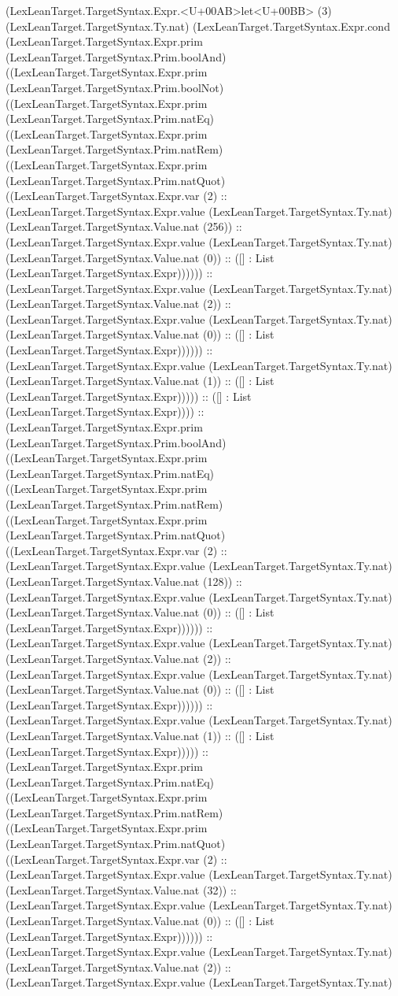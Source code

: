 \documentclass[11pt]{article}
\begin{document}
(LexLeanTarget.TargetSyntax.Expr.<U+00AB>let<U+00BB> (3) (LexLeanTarget.TargetSyntax.Ty.nat) (LexLeanTarget.TargetSyntax.Expr.cond (LexLeanTarget.TargetSyntax.Expr.prim (LexLeanTarget.TargetSyntax.Prim.boolAnd) ((LexLeanTarget.TargetSyntax.Expr.prim (LexLeanTarget.TargetSyntax.Prim.boolNot) ((LexLeanTarget.TargetSyntax.Expr.prim (LexLeanTarget.TargetSyntax.Prim.natEq) ((LexLeanTarget.TargetSyntax.Expr.prim (LexLeanTarget.TargetSyntax.Prim.natRem) ((LexLeanTarget.TargetSyntax.Expr.prim (LexLeanTarget.TargetSyntax.Prim.natQuot) ((LexLeanTarget.TargetSyntax.Expr.var (2) :: (LexLeanTarget.TargetSyntax.Expr.value (LexLeanTarget.TargetSyntax.Ty.nat) (LexLeanTarget.TargetSyntax.Value.nat (256)) :: (LexLeanTarget.TargetSyntax.Expr.value (LexLeanTarget.TargetSyntax.Ty.nat) (LexLeanTarget.TargetSyntax.Value.nat (0)) :: ([] : List (LexLeanTarget.TargetSyntax.Expr)))))) :: (LexLeanTarget.TargetSyntax.Expr.value (LexLeanTarget.TargetSyntax.Ty.nat) (LexLeanTarget.TargetSyntax.Value.nat (2)) :: (LexLeanTarget.TargetSyntax.Expr.value (LexLeanTarget.TargetSyntax.Ty.nat) (LexLeanTarget.TargetSyntax.Value.nat (0)) :: ([] : List (LexLeanTarget.TargetSyntax.Expr)))))) :: (LexLeanTarget.TargetSyntax.Expr.value (LexLeanTarget.TargetSyntax.Ty.nat) (LexLeanTarget.TargetSyntax.Value.nat (1)) :: ([] : List (LexLeanTarget.TargetSyntax.Expr))))) :: ([] : List (LexLeanTarget.TargetSyntax.Expr)))) :: (LexLeanTarget.TargetSyntax.Expr.prim (LexLeanTarget.TargetSyntax.Prim.boolAnd) ((LexLeanTarget.TargetSyntax.Expr.prim (LexLeanTarget.TargetSyntax.Prim.natEq) ((LexLeanTarget.TargetSyntax.Expr.prim (LexLeanTarget.TargetSyntax.Prim.natRem) ((LexLeanTarget.TargetSyntax.Expr.prim (LexLeanTarget.TargetSyntax.Prim.natQuot) ((LexLeanTarget.TargetSyntax.Expr.var (2) :: (LexLeanTarget.TargetSyntax.Expr.value (LexLeanTarget.TargetSyntax.Ty.nat) (LexLeanTarget.TargetSyntax.Value.nat (128)) :: (LexLeanTarget.TargetSyntax.Expr.value (LexLeanTarget.TargetSyntax.Ty.nat) (LexLeanTarget.TargetSyntax.Value.nat (0)) :: ([] : List (LexLeanTarget.TargetSyntax.Expr)))))) :: (LexLeanTarget.TargetSyntax.Expr.value (LexLeanTarget.TargetSyntax.Ty.nat) (LexLeanTarget.TargetSyntax.Value.nat (2)) :: (LexLeanTarget.TargetSyntax.Expr.value (LexLeanTarget.TargetSyntax.Ty.nat) (LexLeanTarget.TargetSyntax.Value.nat (0)) :: ([] : List (LexLeanTarget.TargetSyntax.Expr)))))) :: (LexLeanTarget.TargetSyntax.Expr.value (LexLeanTarget.TargetSyntax.Ty.nat) (LexLeanTarget.TargetSyntax.Value.nat (1)) :: ([] : List (LexLeanTarget.TargetSyntax.Expr))))) :: (LexLeanTarget.TargetSyntax.Expr.prim (LexLeanTarget.TargetSyntax.Prim.natEq) ((LexLeanTarget.TargetSyntax.Expr.prim (LexLeanTarget.TargetSyntax.Prim.natRem) ((LexLeanTarget.TargetSyntax.Expr.prim (LexLeanTarget.TargetSyntax.Prim.natQuot) ((LexLeanTarget.TargetSyntax.Expr.var (2) :: (LexLeanTarget.TargetSyntax.Expr.value (LexLeanTarget.TargetSyntax.Ty.nat) (LexLeanTarget.TargetSyntax.Value.nat (32)) :: (LexLeanTarget.TargetSyntax.Expr.value (LexLeanTarget.TargetSyntax.Ty.nat) (LexLeanTarget.TargetSyntax.Value.nat (0)) :: ([] : List (LexLeanTarget.TargetSyntax.Expr)))))) :: (LexLeanTarget.TargetSyntax.Expr.value (LexLeanTarget.TargetSyntax.Ty.nat) (LexLeanTarget.TargetSyntax.Value.nat (2)) :: (LexLeanTarget.TargetSyntax.Expr.value (LexLeanTarget.TargetSyntax.Ty.nat) 
\end{document}
